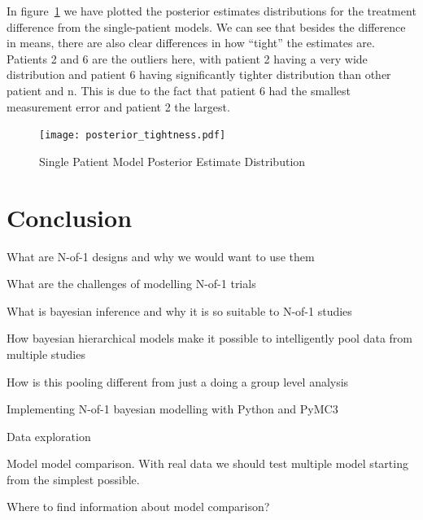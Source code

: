 \documentclass[12pt,a4paper,leqno]{report}
\theoremstyle{plain}
\theoremstyle{definition}
\theoremstyle{remark}
\begin{document}
In figure\ \ref{modeltightness} we have plotted the posterior estimates distributions for the
treatment difference from the single-patient models. We can see that besides the
difference in means, there are also clear differences in how ``tight'' the estimates
are. Patients 2 and 6 are the outliers here, with patient 2 having a very wide
distribution and patient 6 having significantly tighter
distribution than other patient and n. This
is due to the fact that patient 6 had the smallest measurement error and patient 2 the
largest.


\bigskip
\begin{figure}[H]
    \caption{Single Patient Model Posterior Estimate Distribution}\label{modeltightness}
    \bigskip
    \texttt{[image: posterior\_tightness.pdf]}
\end{figure}
\bigskip

\chapter{Conclusion}



What are N-of-1 designs and why we would want to use them

What are the challenges of modelling N-of-1 trials

What is bayesian inference and why it is so suitable to N-of-1 studies

How bayesian hierarchical models make it possible to intelligently pool data from
multiple studies

How is this pooling different from just a doing a group level analysis

Implementing N-of-1 bayesian modelling with Python and PyMC3


Data exploration

Model model comparison. With real data we should test multiple model starting from the
simplest possible.

Where to find information about model comparison?

\end{document}
